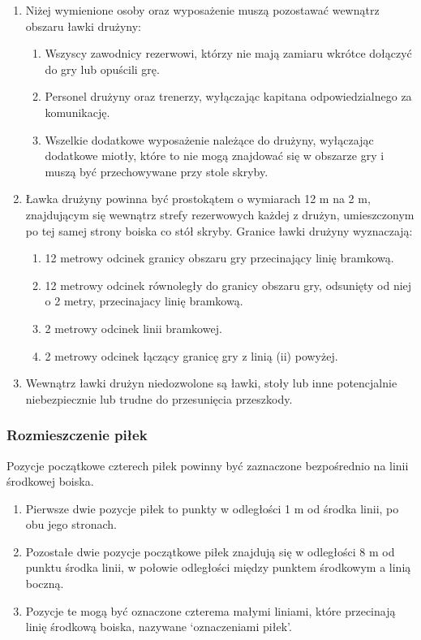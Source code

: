 \documentclass[12pt]{article}
\begin{document}
\begin{enumerate}
\item Niżej wymienione osoby oraz wyposażenie muszą pozostawać wewnątrz
  obszaru ławki drużyny:
  
  \begin{enumerate}
  \item Wszyscy zawodnicy rezerwowi, którzy nie mają zamiaru wkrótce
    dołączyć do gry lub opuścili grę.
  \item Personel drużyny oraz trenerzy, wyłączając kapitana odpowiedzialnego
    za komunikację.
  \item Wszelkie dodatkowe wyposażenie należące do drużyny, wyłączając
    dodatkowe miotły, które to nie mogą znajdować się w obszarze gry i
    muszą być przechowywane przy stole skryby.
  \end{enumerate}

\item Ławka drużyny powinna być prostokątem o wymiarach 12 m na 2 m,
  znajdującym się wewnątrz strefy rezerwowych każdej z drużyn,
  umieszczonym po tej samej strony boiska co stół skryby. Granice ławki
  drużyny wyznaczają:
  
  \begin{enumerate}
  \item 12 metrowy odcinek granicy obszaru gry przecinający linię bramkową.
  \item 12 metrowy odcinek równoległy do granicy obszaru gry, odsunięty od
    niej o 2 metry, przecinajacy linię bramkową.
  \item 2 metrowy odcinek linii bramkowej.
  \item 2 metrowy odcinek łączący granicę gry z linią (ii) powyżej.
  \end{enumerate}

\item Wewnątrz ławki drużyn niedozwolone są ławki, stoły lub inne
  potencjalnie niebezpiecznie lub trudne do przesunięcia przeszkody.
\end{enumerate}

\subsubsection{Rozmieszczenie piłek}

Pozycje początkowe czterech piłek powinny być zaznaczone bezpośrednio na
linii środkowej boiska.
\begin{enumerate}
\item Pierwsze dwie pozycje piłek to punkty w odległości 1 m od środka
linii, po obu jego stronach.

\item Pozostałe dwie pozycje początkowe piłek znajdują się w odległości 8 m
od punktu środka linii, w połowie odległości między punktem środkowym a
linią boczną.

\item Pozycje te mogą być oznaczone czterema małymi liniami, które
przecinają linię środkową boiska, nazywane `oznaczeniami piłek'.
\end{enumerate}
\end{document}
